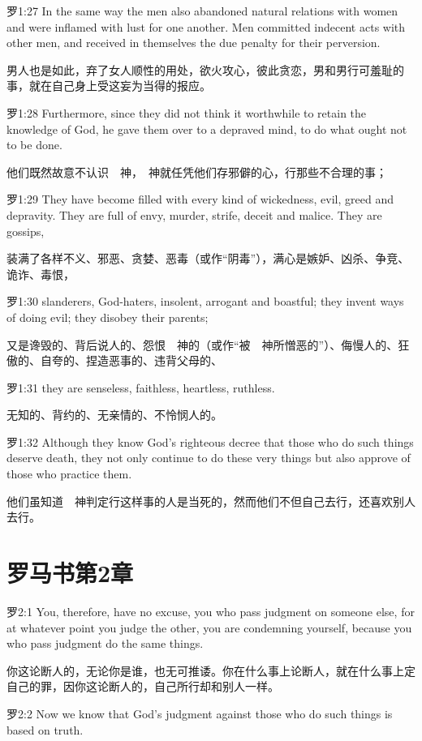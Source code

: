 \documentclass[a4paper,11pt,onecolumn,twoside]{ctexart}
\begin{document}
\begin{multicols}{2}
 罗1:27
 In the same way the men also abandoned natural relations with women and were inflamed with lust for one another. Men committed indecent acts with other men, and received in themselves the due penalty for their perversion.

 男人也是如此，弃了女人顺性的用处，欲火攻心，彼此贪恋，男和男行可羞耻的事，就在自己身上受这妄为当得的报应。


 罗1:28
 Furthermore, since they did not think it worthwhile to retain the knowledge of God, he gave them over to a depraved mind, to do what ought not to be done.

 他们既然故意不认识　神，　神就任凭他们存邪僻的心，行那些不合理的事；


 罗1:29
 They have become filled with every kind of wickedness, evil, greed and depravity. They are full of envy, murder, strife, deceit and malice. They are gossips,

 装满了各样不义、邪恶、贪婪、恶毒（或作“阴毒”），满心是嫉妒、凶杀、争竞、诡诈、毒恨，


 罗1:30
 slanderers, God-haters, insolent, arrogant and boastful; they invent ways of doing evil; they disobey their parents;

 又是谗毁的、背后说人的、怨恨　神的（或作“被　神所憎恶的”）、侮慢人的、狂傲的、自夸的、捏造恶事的、违背父母的、


 罗1:31
 they are senseless, faithless, heartless, ruthless.

 无知的、背约的、无亲情的、不怜悯人的。


 罗1:32
 Although they know God's righteous decree that those who do such things deserve death, they not only continue to do these very things but also approve of those who practice them.

 他们虽知道　神判定行这样事的人是当死的，然而他们不但自己去行，还喜欢别人去行。


\section{ 罗马书第2章}
 罗2:1
 You, therefore, have no excuse, you who pass judgment on someone else, for at whatever point you judge the other, you are condemning yourself, because you who pass judgment do the same things.

 你这论断人的，无论你是谁，也无可推诿。你在什么事上论断人，就在什么事上定自己的罪，因你这论断人的，自己所行却和别人一样。


 罗2:2
 Now we know that God's judgment against those who do such things is based on truth.


\end{multicols}
\end{document}
